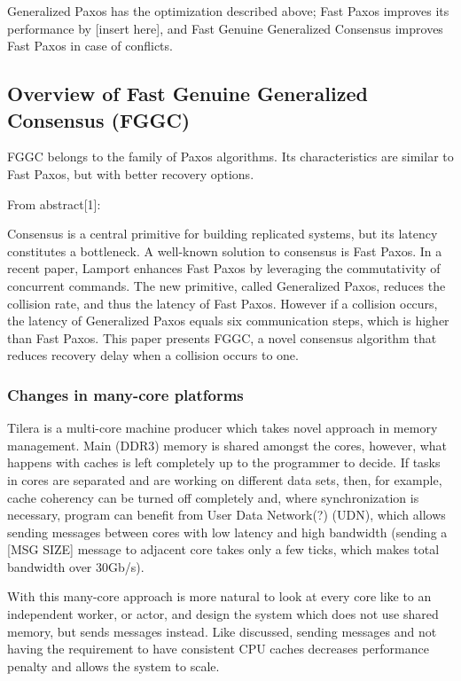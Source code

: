 \documentclass[english,11pt]{article}
\begin{document}
Generalized Paxos has the optimization described above; Fast Paxos improves its
performance by [insert here], and Fast Genuine Generalized Consensus improves
Fast Paxos in case of conflicts.

\subsection{Overview of Fast Genuine Generalized Consensus (FGGC)}

FGGC belongs to the family of Paxos algorithms. Its characteristics are similar
to Fast Paxos, but with better recovery options.

From abstract[1]:

Consensus is a central primitive for building replicated systems, but its
latency constitutes a bottleneck. A well-known solution to consensus is Fast
Paxos. In a recent paper, Lamport enhances Fast Paxos by leveraging the
commutativity of concurrent commands. The new primitive, called Generalized
Paxos, reduces the collision rate, and thus the latency of Fast Paxos. However
if a collision occurs, the latency of Generalized Paxos equals six
communication steps, which is higher than Fast Paxos. This paper presents FGGC,
a novel consensus algorithm that reduces recovery delay when a collision occurs
to one.

\subsubsection{Changes in many-core platforms}
\label{sec:many-core}

Tilera is a multi-core machine producer which takes novel approach in memory
management. Main (DDR3) memory is shared amongst the cores, however, what
happens with caches is left completely up to the programmer to decide. If tasks
in cores are separated and are working on different data sets, then, for
example, cache coherency can be turned off completely and, where synchronization
is necessary, program can benefit from User Data Network(?) (UDN), which allows
sending messages between cores with low latency and high bandwidth (sending a
[MSG SIZE] message to adjacent core takes only a few ticks, which makes total
bandwidth over 30Gb/s).

With this many-core approach is more natural to look at every core like to an
independent worker, or actor, and design the system which does not use shared
memory, but sends messages instead. Like discussed, sending messages and not
having the requirement to have consistent CPU caches decreases performance
penalty and allows the system to scale.
\end{document}
